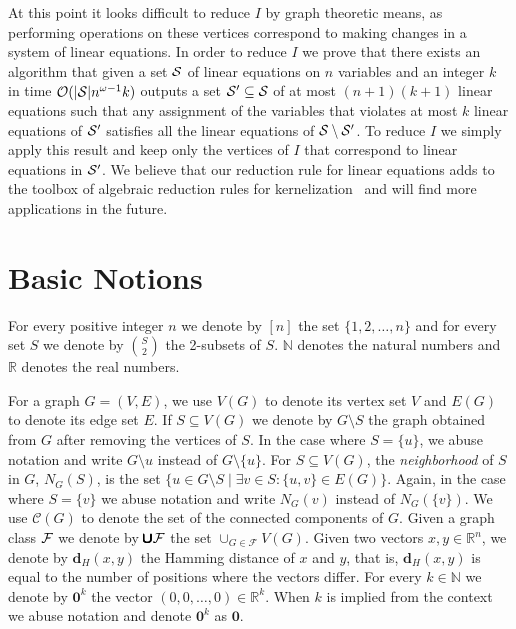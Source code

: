 \documentclass[a4paper,11pt]{article}
\newcommand{\cc}{{\mathcal{C}}}
\newcommand{\Oh}{{\mathcal{O}}}
\newcommand{\hd}{\textbf{d}_{H}}
\newcommand{\cupall}{\pmb{\pmb{\cup}}}
\begin{document}
At this point it looks difficult to reduce $I$ by graph theoretic means, as performing operations on these vertices correspond to making changes in a system of linear equations. In order to reduce $I$ we prove that there exists an algorithm that given a set ${\cal S}$ of linear equations on $n$ variables and an integer $k$ in time $\Oh(|{\cal S}| n^{\omega-1}k)$ outputs a set ${\cal S}'\subseteq {\cal S}$ of at most $(n+1)(k+1)$ linear equations such that any assignment of the variables that violates at most $k$ linear equations of ${\cal S}'$ satisfies all the linear equations of ${\cal S}\setminus {\cal S}'$. To reduce $I$ we simply apply this result and keep only the vertices of $I$ that correspond to linear equations in ${\cal S}'$. We believe that our reduction rule for linear equations adds to the toolbox of algebraic reduction rules for kernelization~\cite{KratschW12soda,KratschW12,Wahlstrom13} and will find more applications in the future.





\section{Basic Notions}

For every positive integer $n$ we denote by $[n]$ the set $\{1,2,\dots,n\}$ and for every set $S$ we denote by $\binom{S}{2}$ the 2-subsets of $S$. $\mathbb{N}$ denotes the natural numbers and $\mathbb{R}$ denotes the real numbers.

For a  {graph} $G=(V,E)$, we use  $V(G)$ to denote its vertex set $V$ and $E(G)$ to denote its edge set $E$.
If $S\subseteq V(G)$ we denote by $G\setminus S$ the graph obtained from $G$ after removing the vertices of $S$. 
In the case where $S=\{u\}$, we abuse notation and write $G\setminus u$ instead of $G\setminus \{u\}$.  
For $S\subseteq V(G)$, the {\em neighborhood} of $S$ in $G$, $N_{G}(S)$, is the set $\{u\in G\setminus S\mid \exists v\in S: \{u,v\}\in E(G)\}$.
Again, in the case where $S=\{v\}$ we abuse notation and write $N_{G}(v)$ instead of $N_{G}(\{v\})$.
We use  $\cc(G)$ to denote the set of the connected components of $G$.
Given a graph class ${\cal F}$ we denote by $\cupall {\cal F}$ the set $\cup_{G\in \mathcal{F}}V(G)$.
Given two vectors $x,y\in \mathbb{R}^{n}$, we denote by $\hd(x,y)$ the Hamming distance of $x$ and $y$, that is, $\hd(x,y)$ is equal to 
the number of positions where the vectors differ. For every $k\in \mathbb{N}$ we denote by $\mathbf{0}^{k}$ the vector $(0,0,\dots,0)\in \mathbb{R}^{k}$. 
When $k$ is implied from the context we abuse notation and denote $\mathbf{0}^{k}$ as $\mathbf{0}$.
\end{document}
